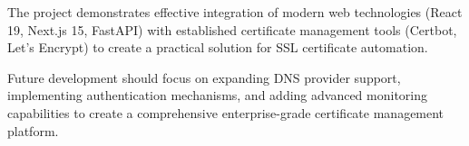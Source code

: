 The project demonstrates effective integration of modern web technologies (React 19, Next.js 15, FastAPI) with established certificate management tools (Certbot, Let's Encrypt) to create a practical solution for SSL certificate automation.

Future development should focus on expanding DNS provider support, implementing authentication mechanisms, and adding advanced monitoring capabilities to create a comprehensive enterprise-grade certificate management platform.
